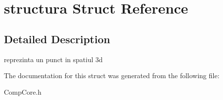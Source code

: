 \hypertarget{structstructura}{\section{structura Struct Reference}
\label{structstructura}
}


\subsection{Detailed Description}
reprezinta un punct in spatiul 3d 

The documentation for this struct was generated from the following file\-:\begin{DoxyCompactItemize}
\item 
Comp\-Core.\-h\end{DoxyCompactItemize}
